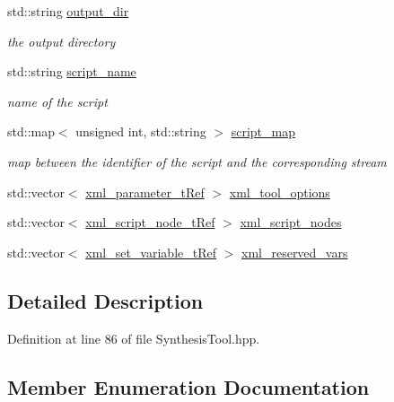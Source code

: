 \begin{DoxyCompactItemize}
std\+::string \hyperlink{classSynthesisTool_a285793f6f539ed6f049c375cdb68d607}{output\+\_\+dir}
\begin{DoxyCompactList}\small\item\em the output directory \end{DoxyCompactList}\item 
std\+::string \hyperlink{classSynthesisTool_aea5cb1e9b66387f4f9a51e4adb2d5dc2}{script\+\_\+name}
\begin{DoxyCompactList}\small\item\em name of the script \end{DoxyCompactList}\item 
std\+::map$<$ unsigned int, std\+::string $>$ \hyperlink{classSynthesisTool_a0ce13155500ff964c4b5c44954ec0c70}{script\+\_\+map}
\begin{DoxyCompactList}\small\item\em map between the identifier of the script and the corresponding stream \end{DoxyCompactList}\item 
std\+::vector$<$ \hyperlink{xml__script__command_8hpp_aec6b63d2a298703bc3ead113609b27a6}{xml\+\_\+parameter\+\_\+t\+Ref} $>$ \hyperlink{classSynthesisTool_a03e683138b6ceb7fd0936586278c2f4b}{xml\+\_\+tool\+\_\+options}
\item 
std\+::vector$<$ \hyperlink{xml__script__command_8hpp_a1fe3d50ade66bc35e41be9b68bbbcd02}{xml\+\_\+script\+\_\+node\+\_\+t\+Ref} $>$ \hyperlink{classSynthesisTool_abacae2cf584de74220837a216beafeef}{xml\+\_\+script\+\_\+nodes}
\item 
std\+::vector$<$ \hyperlink{xml__script__command_8hpp_a77453d591123aae088dbc1d0efe15f00}{xml\+\_\+set\+\_\+variable\+\_\+t\+Ref} $>$ \hyperlink{classSynthesisTool_ac55fea7c736345f7f6356cc31fc4f530}{xml\+\_\+reserved\+\_\+vars}
\end{DoxyCompactItemize}


\subsection{Detailed Description}


Definition at line 86 of file Synthesis\+Tool.\+hpp.



\subsection{Member Enumeration Documentation}
\mbox{\label{classSynthesisTool_a8a3b714a93c1e17e715253b5ea2e2647}} 
